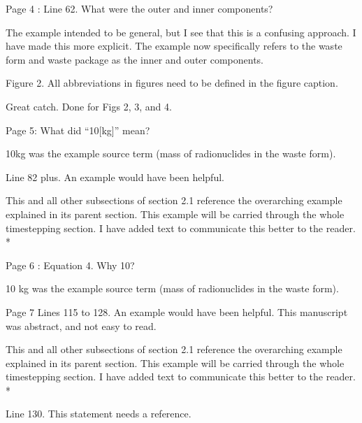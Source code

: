 \documentclass[answers,12pt]{exam}
\begin{document}
\begin{questions}
\question Page 4 : Line 62. What were the outer and inner components?

\begin{solution}
        The example intended to be general, but I see that this is a confusing 
approach. I have made this more explicit. The example now specifically refers 
to the waste form and waste package as the inner and outer components.  
\end{solution}
 

\question Figure 2. All abbreviations in figures need to be defined in the figure caption.
\begin{solution}
Great catch. Done for Figs 2, 3, and 4.
\end{solution}
 

\question Page 5: What did “10[kg]” mean?
\begin{solution}
        10kg was the example source term (mass of radionuclides in the waste 
        form).
\end{solution}
 

\question Line 82 plus. An example would have been helpful.
\begin{solution}
This and all other subsections of section 2.1 reference the overarching example 
        explained in its parent section. This example will be carried through 
        the whole timestepping section. I have added text to communicate this 
        better to the reader. 
        {\color{red}*}
\end{solution}

 

\question Page 6 : Equation 4. Why 10?
\begin{solution}
        10 kg was the example source term (mass of radionuclides in the waste 
        form).
\end{solution}

\question Page 7 Lines 115 to 128. An example would have been helpful. This manuscript was abstract, and not easy to read.

\begin{solution}
This and all other subsections of section 2.1 reference the overarching example 
        explained in its parent section. This example will be carried through 
        the whole timestepping section. I have added text to communicate this 
        better to the reader. 
        {\color{red}*}
\end{solution}
 

\question Line 130. This statement needs a reference.


\end{questions}
\end{document}
